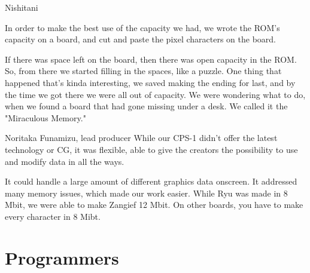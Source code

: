 \pagebreak

\begin{q}{Nishitani\cite{ffdevinterview}}
  
In order to make the best use of the capacity we had, we wrote the ROM's capacity on a board, and cut and paste the pixel characters on the board.
 
If there was space left on the board, then there was open capacity in the ROM. So, from there we started filling in the spaces, like a puzzle. One thing that happened that's kinda interesting, we saved making the ending for last, and by the time we got there we were all out of capacity. We were wondering what to do, when we found a board that had gone missing under a desk. We called it the "Miraculous Memory."


\end{q}

\pagebreak

\pagebreak

\pagebreak

\pagebreak

\pagebreak



\begin{q}{Noritaka Funamizu, lead producer\cite{retro}}
  While our CPS-1 didn't offer the latest technology or CG, it was flexible, able to give the creators the possibility to use and modify data in all the ways.


  It could handle a large amount of different graphics data onscreen. It addressed many memory issues, which made our work easier. While Ryu was made in 8 Mbit, we were able to make Zangief 12 Mbit. On other boards, you have to make every character in 8 Mibt.
  \end{q}

\section{Programmers}






